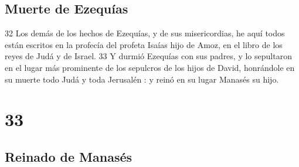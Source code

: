 \section*{Muerte de Ezequías }

32 Los demás de los hechos de Ezequías, y de sus misericordias, he aquí todos están escritos en la profecía del profeta Isaías hijo de Amoz, en el libro de los reyes de Judá y de Israel.
33 Y durmió Ezequías con sus padres, y lo sepultaron en el lugar más prominente de los sepulcros de los hijos de David, honrándole en su muerte todo Judá y toda Jerusalén : y reinó en su lugar Manasés su hijo.

\chapter{33}

\section*{Reinado de Manasés}

